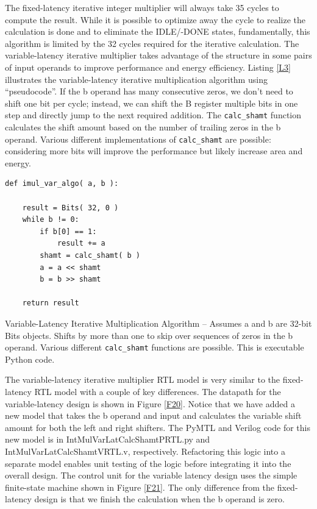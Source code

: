 \documentclass[a4paper,12pt,twoside]{article}
\begin{document}
The fixed-latency iterative integer multiplier will always take 35 cycles to compute the result. While it is possible to optimize away the cycle to realize the calculation is done and to eliminate the IDLE/-DONE states, fundamentally, this algorithm is limited by the 32 cycles required for the iterative calculation. The variable-latency iterative multiplier takes advantage of the structure in some pairs of input operands to improve performance and energy efficiency. Listing \ref{L3} illustrates the variable-latency iterative multiplication algorithm using “pseudocode”. If the b operand has many consecutive zeros, we don’t need to shift one bit per cycle; instead, we can shift the B register multiple bits in one step and directly jump to the next required addition. The \texttt{calc\_shamt} function calculates the shift amount based on the number of trailing zeros in the b operand. Various different implementations of \texttt{calc\_shamt} are possible: considering more bits will improve the performance but likely increase area and energy.
\begin{listing}[H]
\begin{verbatim}
def imul_var_algo( a, b ):

    result = Bits( 32, 0 )
    while b != 0:
        if b[0] == 1:
            result += a
        shamt = calc_shamt( b )
        a = a << shamt
        b = b >> shamt
        
    return result
\end{verbatim}
\caption{Variable-Latency Iterative Multiplication Algorithm – Assumes a and b are 32-bit Bits objects. Shifts
by more than one to skip over sequences of zeros in the b operand. Various different \texttt{calc\_shamt} functions are possible. This is executable Python code.}
\label{L3}
\end{listing}
The variable-latency iterative multiplier RTL model is very similar to the fixed-latency RTL model with a couple of key differences. The datapath for the variable-latency design is shown in Figure \ref{F20}. Notice that we have added a new model that takes the b operand and input and calculates the variable shift amount for both the left and right shifters. The PyMTL and Verilog code for this new model is in IntMulVarLatCalcShamtPRTL.py and IntMulVarLatCalcShamtVRTL.v, respectively. Refactoring this logic into a separate model enables unit testing of the logic before integrating it into the overall design. The control unit for the variable latency design uses the simple finite-state machine shown in Figure \ref{F21}. The only difference from the fixed-latency design is that we finish the calculation when the b operand is zero.%
\end{document}
